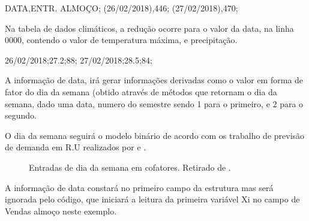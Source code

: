 \documentclass[	12pt, Times, openright, twoside, a4paper, english, brazil]{abntex2}
\begin{document}
          \begin{algorithm}
          DATA,ENTR. ALMOÇO;
          (26/02/2018),446;
          (27/02/2018),470;   
          \end{algorithm}

          Na tabela de dados climáticos, a redução ocorre para o valor da data, na linha 0000, contendo o valor de temperatura máxima, e precipitação.

          \begin{algorithm}
          26/02/2018;27.2;88;
          27/02/2018;28.5;84;
          \end{algorithm}

          A informação de data, irá gerar informações derivadas como o valor em forma de fator do dia da semana (obtido através de métodos que retornam o dia da semana, dado uma data, numero do semestre sendo 1 para o primeiro, e 2 para o segundo.

          O dia da semana seguirá o modelo binário de acordo com os trabalho de previsão de demanda em R.U realizados por \cite{Lopes2008} e \cite{Rocha2011}.

          \begin{figure}[!ht]
          	\caption{Entradas de dia da semana em cofatores. Retirado de \cite{Lopes2008}.\label{fig:entradasSemanais}}
          \end{figure}

          A informação de data constará no primeiro campo da estrutura mas será ignorada pelo código, que iniciará a leitura da primeira variável Xi no campo de Vendas almoço neste exemplo.
\end{document}
